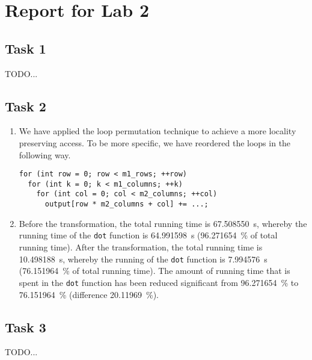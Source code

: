\documentclass[a4paper, DIV12, headsepline]{scrartcl}
\begin{document}
\section*{Report for Lab 2}
\subsection*{Task 1}
TODO...


\subsection*{Task 2}
\begin{enumerate}[label=\alph*)]
\item We have applied the loop permutation technique to achieve a more locality preserving access. To be more specific, we have reordered the loops in the following way.
\begin{verbatim}
for (int row = 0; row < m1_rows; ++row)
  for (int k = 0; k < m1_columns; ++k)
    for (int col = 0; col < m2_columns; ++col)
      output[row * m2_columns + col] += ...;
\end{verbatim}

\item Before the transformation, the total running time is \SI{67.508550}{s}, whereby the running time of the \texttt{dot} function is \SI{64.991598}{s} (\SI{96.271654}{\%} of total running time). After the transformation, the total running time is \SI{10.498188}{s}, whereby the running of the \texttt{dot} function is \SI{7.994576}{s} (\SI{76.151964}{\%} of total running time). The amount of running time that is spent in the \texttt{dot} function has been reduced significant from \SI{96.271654}{\%} to \SI{76.151964}{\%} (difference \SI{20.11969}{\%}).
\end{enumerate}



\subsection*{Task 3}
TODO...
\end{document}
